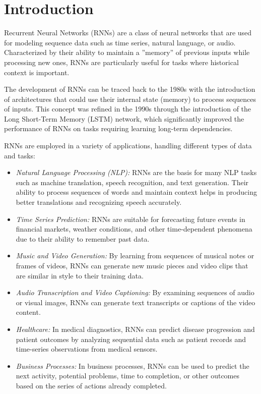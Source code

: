 \section{Introduction}

Recurrent Neural Networks (RNNs) are a class of neural networks that are used for modeling sequence data such as time series, natural language, or audio. Characterized by their ability to maintain a ''memory'' of previous inputs while processing new ones, RNNs are particularly useful for tasks where historical context is important.

The development of RNNs can be traced back to the 1980s with the introduction of architectures that could use their internal state (memory) to process sequences of inputs. This concept was refined in the 1990s through the introduction of the Long Short-Term Memory (LSTM) network, which significantly improved the performance of RNNs on tasks requiring learning long-term dependencies.

RNNs are employed in a variety of applications, handling different types of data and tasks:
\begin{itemize}
\item \emph{Natural Language Processing (NLP):} RNNs are the basis for many NLP tasks such as machine translation, speech recognition, and text generation. Their ability to process sequences of words and maintain context helps in producing better translations and recognizing speech accurately.
\item \emph{Time Series Prediction:} RNNs are suitable for forecasting future events in financial markets, weather conditions, and other time-dependent phenomena due to their ability to remember past data.
\item \emph{Music and Video Generation:} By learning from sequences of musical notes or frames of videos, RNNs can generate new music pieces and video clips that are similar in style to their training data.
\item \emph{Audio Transcription and Video Captioning:} By examining sequences of audio or visual images, RNNs can generate text transcripts or captions of the video content.  
\item \emph{Healthcare:} In medical diagnostics, RNNs can predict disease progression and patient outcomes by analyzing sequential data such as patient records and time-series observations from medical sensors.
\item \emph{Business Processes:} In business processes, RNNs can be used to predict the next activity, potential problems, time to completion, or other outcomes based on the series of actions already completed.
\end{itemize}

